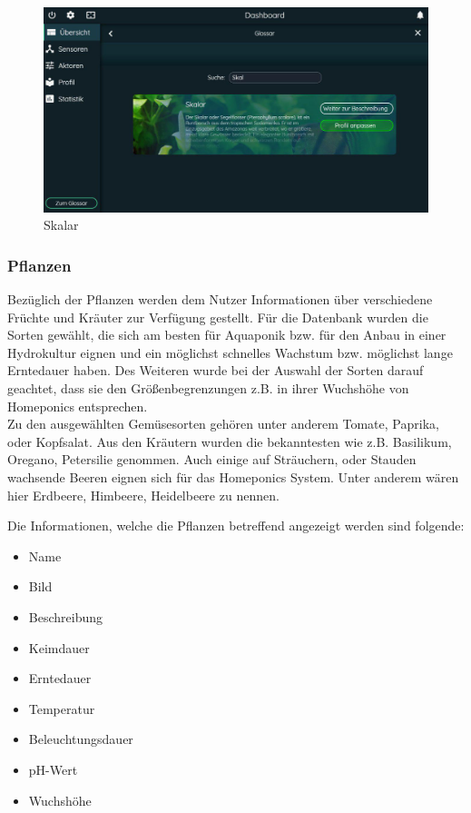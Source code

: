 \begin{figure}[ht]
    \centering
	\includegraphics[width=\textwidth]{images/skalar}
    \caption{Skalar}
\end{figure}\mbox{}

\newpage

\subsubsection{Pflanzen}
Bezüglich der Pflanzen werden dem Nutzer Informationen über verschiedene Früchte und Kräuter zur Verfügung gestellt. Für die Datenbank wurden die Sorten gewählt, die sich am besten für Aquaponik bzw. für den Anbau in einer Hydrokultur eignen und ein möglichst schnelles Wachstum bzw. möglichst lange Erntedauer haben. Des Weiteren wurde bei der Auswahl der Sorten darauf geachtet, dass sie den Größenbegrenzungen z.B. in ihrer Wuchshöhe von Homeponics entsprechen.\\Zu den ausgewählten Gemüsesorten gehören unter anderem Tomate, Paprika, oder Kopfsalat. Aus den Kräutern wurden die bekanntesten wie z.B. Basilikum, Oregano, Petersilie genommen. Auch einige auf Sträuchern, oder Stauden wachsende Beeren eignen sich für das Homeponics System. Unter anderem wären hier Erdbeere, Himbeere, Heidelbeere zu nennen.

Die Informationen, welche die Pflanzen betreffend angezeigt werden sind folgende:

\begin{itemize}
    \item Name
    \item Bild
    \item Beschreibung
    \item Keimdauer
    \item Erntedauer
    \item Temperatur
    \item Beleuchtungsdauer
    \item pH-Wert
    \item Wuchshöhe
\end{itemize}

